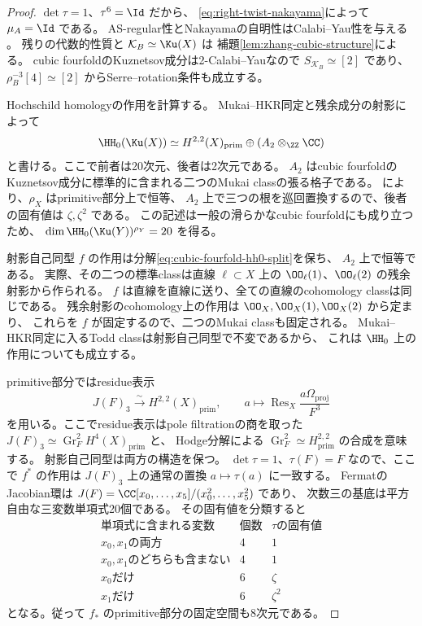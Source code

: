 \begin{proof}
 \(\det\tau=1\)、\(\tau^6=\Id\) だから、
 \eqref{eq:right-twist-nakayama}によって \(\mu_A=\Id\) である。
 AS-regular性とNakayamaの自明性はCalabi--Yau性を与える
 \cite[Lemma 1.2, Theorem 5.4]{RRZ}。
 残りの代数的性質と \(\mathcal K_B\simeq\Ku(X)\) は
 補題\ref{lem:zhang-cubic-structure}による。
 cubic fourfoldのKuznetsov成分は2-Calabi--Yauなので
 \(S_{\mathcal K_B}\simeq[2]\) であり、
 \(\rho_B^{-3}[4]\simeq[2]\) からSerre--rotation条件も成立する。

 Hochschild homologyの作用を計算する。
 Mukai--HKR同定と残余成分の射影によって
 \begin{equation}\label{eq:cubic-fourfold-hh0-split}
 \HH_0(\Ku(X))\simeq
 H^{2,2}(X)_{\mathrm{prim}}\oplus (A_2\otimes_{\ZZ}\CC)
 \end{equation}
 と書ける。ここで前者は20次元、後者は2次元である。
 \(A_2\) はcubic fourfoldのKuznetsov成分に標準的に含まれる二つのMukai classの張る格子である。
 \cite[Proposition 3.12]{Huy}により、\(\rho_X\) はprimitive部分上で恒等、
 \(A_2\) 上で三つの根を巡回置換するので、後者の固有値は \(\zeta,\zeta^2\) である。
 この記述は一般の滑らかなcubic fourfoldにも成り立つため、
 \(\dim\HH_0(\Ku(Y))^{\rho_Y}=20\) を得る。

 射影自己同型 \(f\) の作用は分解\eqref{eq:cubic-fourfold-hh0-split}を保ち、
 \(A_2\) 上で恒等である。
 実際、その二つの標準classは直線 \(\ell\subset X\) 上の
 \(\OO_\ell(1)\)、\(\OO_\ell(2)\) の残余射影から作られる。
 \(f\) は直線を直線に送り、全ての直線のcohomology classは同じである。
 残余射影のcohomology上の作用は \(\OO_X,\OO_X(1),\OO_X(2)\) から定まり、
 これらを \(f\) が固定するので、二つのMukai classも固定される。
 Mukai--HKR同定に入るTodd classは射影自己同型で不変であるから、
 これは \(\HH_0\) 上の作用についても成立する。

 primitive部分ではresidue表示
 \[
 J(F)_3\xrightarrow{\sim}H^{2,2}(X)_{\mathrm{prim}},\qquad
 a\longmapsto\operatorname{Res}_X\frac{a\Omega_{\mathrm{proj}}}{F^3}
 \]
 を用いる。ここでresidue表示はpole filtrationの商を取った
 \(J(F)_3\simeq\operatorname{Gr}_F^2H^4(X)_{\mathrm{prim}}\) と、
 Hodge分解による \(\operatorname{Gr}_F^2\simeq H^{2,2}_{\mathrm{prim}}\) の合成を意味する。
 射影自己同型は両方の構造を保つ。
 \(\det\tau=1\)、\(\tau(F)=F\) なので、ここで \(f^*\) の作用は
 \(J(F)_3\) 上の通常の置換 \(a\mapsto\tau(a)\) に一致する。
 FermatのJacobian環は \(J(F)=\CC[x_0,\ldots,x_5]/(x_0^2,\ldots,x_5^2)\) であり、
 次数三の基底は平方自由な三変数単項式20個である。
 その固有値を分類すると
 \[
 \begin{array}{c|c|c}
 \text{単項式に含まれる変数}&\text{個数}&\tau\text{の固有値}\\\hline
 x_0,x_1\text{の両方}&4&1\\
 x_0,x_1\text{のどちらも含まない}&4&1\\
 x_0\text{だけ}&6&\zeta\\
 x_1\text{だけ}&6&\zeta^2
 \end{array}
 \]
 となる。従って \(f_*\) のprimitive部分の固定空間も8次元である。


\end{proof}
